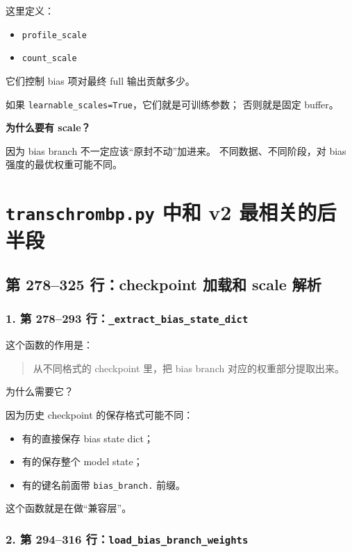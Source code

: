 \documentclass[11pt,a4paper]{ctexart}
\begin{document}
这里定义：

\begin{itemize}[leftmargin=2em]
\item \texttt{profile\_scale}
\item \texttt{count\_scale}
\end{itemize}

它们控制 bias 项对最终 full 输出贡献多少。

如果 \texttt{learnable\_scales=True}，它们就是可训练参数；
否则就是固定 buffer。

\textbf{为什么要有 scale？}

因为 bias branch 不一定应该“原封不动”加进来。
不同数据、不同阶段，对 bias 强度的最优权重可能不同。

\section{\texttt{transchrombp.py} 中和 v2 最相关的后半段}

\subsection{第 278--325 行：checkpoint 加载和 scale 解析}

\subsubsection*{1. 第 278--293 行：\texttt{\_extract\_bias\_state\_dict}}

这个函数的作用是：

\begin{quote}
从不同格式的 checkpoint 里，把 bias branch 对应的权重部分提取出来。
\end{quote}

为什么需要它？

因为历史 checkpoint 的保存格式可能不同：

\begin{itemize}[leftmargin=2em]
\item 有的直接保存 bias state dict；
\item 有的保存整个 model state；
\item 有的键名前面带 \texttt{bias\_branch.} 前缀。
\end{itemize}

这个函数就是在做“兼容层”。

\subsubsection*{2. 第 294--316 行：\texttt{load\_bias\_branch\_weights}}
\end{document}
